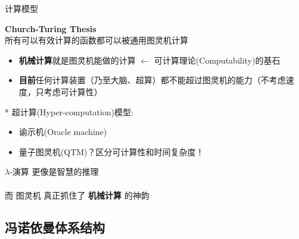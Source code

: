 \documentclass{myslide}
\begin{document}
\begin{frame}{计算模型}
\begin{center}
\Large\textbf{Church-Turing Thesis}\\
\large 所有可以有效计算的函数都可以被通用图灵机计算
\end{center}
\begin{itemize}
	\item \textbf{机械计算}就是图灵机能做的计算 $\gets$ 可计算理论(Computability)的基石 %
	\item \textbf{目前}任何计算装置（乃至大脑、超算）都不能超过图灵机的能力（不考虑速度，只考虑可计算性）
\end{itemize}
\pause
* 超计算(Hyper-computation)模型:
\begin{itemize}
	\item 谕示机(Oracle machine)
	\item 量子图灵机(QTM)？\pause 区分可计算性和时间复杂度！
\end{itemize}
\end{frame}

\begin{frame}
\begin{center}
$\lambda$-演算 更像是智慧的推理\\
\quad\\
而 图灵机 真正抓住了 {\Large\textbf{机械计算}} 的神韵
\end{center}
\end{frame}

\subsection{冯诺依曼体系结构}
\begin{frame}
\subsectionpage
\end{frame}

\end{document}
